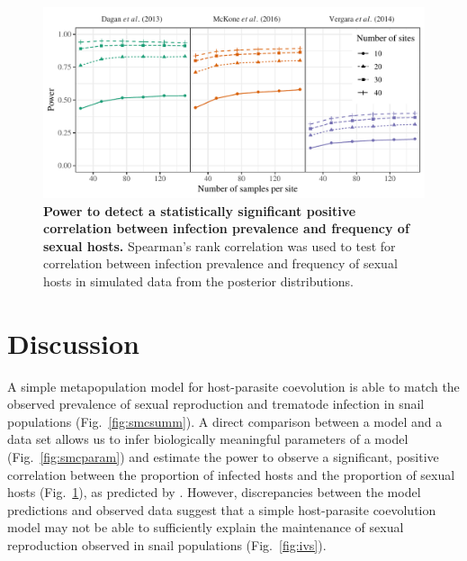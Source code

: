 \documentclass{article}\usepackage[]{graphicx}\usepackage[]{color}
\newcommand{\fref}[1]{Fig.~\ref{fig:#1}}
\begin{document}
\begin{figure}[!ht]
\includegraphics[width=\textwidth]{../fig/power.pdf}
\caption{{\bf Power to detect a statistically significant positive correlation between infection prevalence and frequency of sexual hosts.}
Spearman's rank correlation was used to test for correlation between infection prevalence and frequency of sexual hosts in simulated data from the posterior distributions.
}
\label{fig:power}
\end{figure}

\section{Discussion}

A simple metapopulation model for host-parasite coevolution is able to match the observed prevalence of sexual reproduction and trematode infection in snail populations (\fref{smcsumm}).
A direct comparison between a model and a data set allows us to infer biologically meaningful parameters of a model (\fref{smcparam}) and estimate the power to observe a significant, positive correlation between the proportion of infected hosts and the proportion of sexual hosts (\fref{power}), as predicted by \cite{lively1992parthenogenesis}.
However, discrepancies between the model predictions and observed data suggest that a simple host-parasite coevolution model may not be able to sufficiently explain the maintenance of sexual reproduction observed in snail populations (\fref{ivs}).
\end{document}

